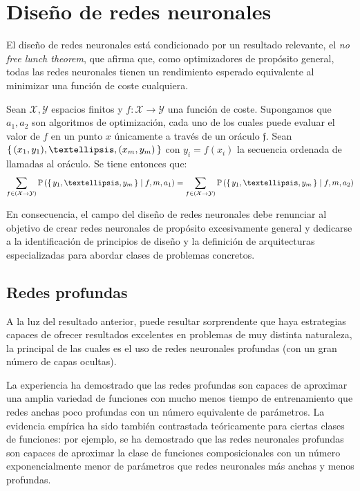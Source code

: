 \section{Diseño de redes neuronales}
El diseño de redes neuronales está condicionado por un resultado relevante, el \textit{no free lunch theorem}, que afirma que, como optimizadores de propósito general, todas las redes neuronales tienen un rendimiento esperado equivalente al minimizar una función de coste cualquiera.
\begin{definition}
    Sean \( \mathcal{X}, \mathcal{Y} \) espacios finitos y \( f \colon \mathcal{X} \to \mathcal{Y} \) una función de coste. Supongamos que \( a_1, a_2 \) son algoritmos de optimización, cada uno de los cuales puede evaluar el valor de \( f \) en un punto \( x \) únicamente a través de un oráculo \( \mathfrak{f} \). Sean \( \Set{ (x_{1}, y_{1}), …, (x_{m}, y_{m}) } \) con \( y_{i} = f(x_{i}) \) la secuencia ordenada de llamadas al oráculo. Se tiene entonces que:
    \[
        \sum_{f \in (\mathcal{X} \to \mathcal{Y})} \mathbb{P} \left( \Set{y_{1}, …, y_{m}} \mid f, m, a_1 \right) = \sum_{f \in (\mathcal{X} \to \mathcal{Y})} \mathbb{P} \left( \Set{y_{1}, …, y_{m}} \mid f, m, a_2 \right)
    \]
\end{definition}

En consecuencia, el campo del diseño de redes neuronales debe renunciar al objetivo de crear redes neuronales de propósito excesivamente general y dedicarse a la identificación de principios de diseño y la definición de arquitecturas especializadas para abordar clases de problemas concretos. 

\subsection{Redes profundas}
A la luz del resultado anterior, puede resultar sorprendente que haya estrategias capaces de ofrecer resultados excelentes en problemas de muy distinta naturaleza, la principal de las cuales es el uso de redes neuronales profundas (con un gran número de capas ocultas).

La experiencia ha demostrado que las redes profundas son capaces de aproximar una amplia variedad de funciones con mucho menos tiempo de entrenamiento que redes anchas poco profundas con un número equivalente de parámetros. La evidencia empírica ha sido también contrastada teóricamente para ciertas clases de funciones: por ejemplo, se ha demostrado que las redes neuronales profundas son capaces de aproximar la clase de funciones composicionales con un número exponencialmente menor de parámetros \cite{mhaskar2017and} que redes neuronales más anchas y menos profundas. 

